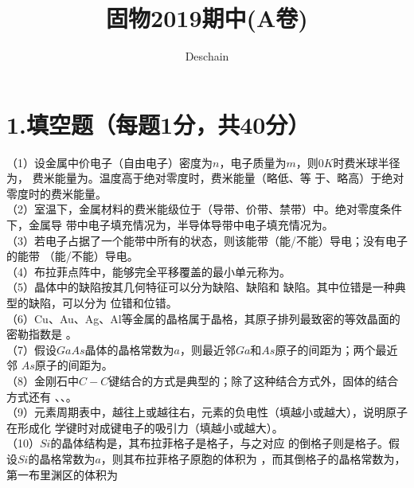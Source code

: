 \documentclass[UTF8]{ctexart}
\title{固物2019期中(A卷)}
\author{Deschain}
\begin{document}
\maketitle
\section*{\bfseries 1.填空题（每题1分，共40分）}
（1）设金属中价电子（自由电子）密度为$n$，电子质量为$m$，则$0K$时费米球半径为\underline{\makebox[6em]{}}，
费米能量为\underline{\makebox[8em]{}}。温度高于绝对零度时，费米能量\underline{\makebox[4em]{}}（略低、等
于、略高）于绝对零度时的费米能量。\\
（2）室温下，金属材料的费米能级位于\underline{\makebox[4em]{}}（导带、价带、禁带）中。绝对零度条件下，金属导
带中电子填充情况为\underline{\makebox[6em]{}}，半导体导带中电子填充情况为\underline{\makebox[6em]{}}。\\
（3）若电子占据了一个能带中所有的状态，则该能带\underline{\makebox[3em]{}}（能/不能）导电；没有电子的能带
\underline{\makebox[3em]{}}（能/不能）导电。\\
（4）布拉菲点阵中，能够完全平移覆盖的最小单元称为\underline{\makebox[3em]{}}。\\
（5）晶体中的缺陷按其几何特征可以分为\underline{\makebox[2em]{}}缺陷、\underline{\makebox[2em]{}}缺陷和
\underline{\makebox[2em]{}}缺陷。其中位错是一种典型的\underline{\makebox[2em]{}}缺陷，可以分为
\underline{\makebox[3em]{}}位错和\underline{\makebox[3em]{}}位错。\\
（6）Cu、Au、Ag、Al等金属的晶格属于\underline{\makebox[6em]{}}晶格，其原子排列最致密的等效晶面的密勒指数是
\underline{\makebox[4em]{}}。\\
（7）假设$GaAs$晶体的晶格常数为$a$，则最近邻$Ga$和$As$原子的间距为\underline{\makebox[3em]{}}；两个最近邻
$As$原子的间距为\underline{\makebox[6em]{}}。\\
（8）金刚石中$C-C$键结合的方式是典型的\underline{\makebox[6em]{}}；除了这种结合方式外，固体的结合方式还有
\underline{\makebox[6em]{}}、\underline{\makebox[6em]{}}、\underline{\makebox[9em]{}}。\\
（9）元素周期表中，越往上或越往右，元素的负电性\underline{\makebox[3em]{}}（填越小或越大），说明原子在形成化
学键时对成键电子的吸引力\underline{\makebox[3em]{}}（填越小或越大）。\\
（10）$Si$的晶体结构是\underline{\makebox[4em]{}}，其布拉菲格子是\underline{\makebox[6em]{}}格子，与之对应
的倒格子则是\underline{\makebox[6em]{}}格子。假设$Si$的晶格常数为$a$，则其布拉菲格子原胞的体积为
\underline{\makebox[3em]{}}，而其倒格子的晶格常数为\underline{\makebox[3em]{}}，第一布里渊区的体积为
\end{document}
